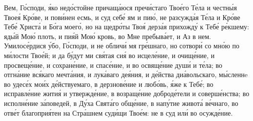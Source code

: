 \begin{mymulticols}

Вем, Г\'{о}споди, \'{я}ко нед\'{о}стойне причащ\'{а}юся преч\'{и}стаго Тво\'{е}го Т\'{е}ла и честн\'{ы}я Твое\'{я} Кр\'{о}ве, и пов\'{и}нен есмь, и суд себ\'{е} ям и пи\'{ю}, не разсужд\'{а}я Т\'{е}ла и Кр\'{о}ве Теб\'{е} Христ\'{а} и Б\'{о}га моег\'{о}, но на щедр\'{о}ты Тво\'{я} дерз\'{а}я прихожд\'{у} к Теб\'{е} р\'{е}кшему: яд\'{ы}й Мо\'{ю} плоть, и пи\'{я}й Мо\'{ю} кровь, во Мне пребыв\'{а}ет, и Аз в нем. Умилос\'{е}рдися \'{у}бо, Г\'{о}споди, и не облич\'{и} мя гр\'{е}шнаго, но сотвор\'{и} со мн\'{о}ю по м\'{и}лости Тво\'{е}й; и да б\'{у}дут ми св\'{я}тая си\'{я} во исцел\'{е}ние, и очищ\'{е}ние, и просвещ\'{е}ние, и сохран\'{е}ние, и спас\'{е}ние, и во освящ\'{е}ние душ\'{и} и т\'{е}ла; во отгн\'{а}ние вс\'{я}каго мечт\'{а}ния, и лук\'{а}ваго де\'{я}ния, и д\'{е}йства ди\'{а}вольскаго, м\'{ы}сленнe во удес\'{е}х мо\'{и}х д\'{е}йствуемаго, в дерзнов\'{е}ние и люб\'{о}вь, \'{я}же к Теб\'{е}; во исправл\'{е}ние жити\'{я} и утвержд\'{е}ние, в возращ\'{е}ние доброд\'{е}тели и соверш\'{е}нства; во исполн\'{е}ние з\'{а}поведей, в Д\'{у}ха Свят\'{а}го общ\'{е}ние, в нап\'{у}тие живот\'{а} в\'{е}чнаго, во отв\'{е}т благопри\'{я}тен на Стр\'{а}шнем суд\'{и}щи Тво\'{е}м: не в суд ил\'{и} во осужд\'{е}ние.



\end{mymulticols}
